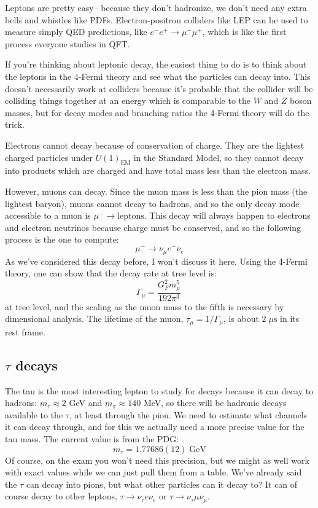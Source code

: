 \documentclass[11pt, oneside]{article}   	%
\theoremstyle{definition}
\numberwithin{equation}{subsection}		%
\begin{document}
Leptons are pretty easy-- because they don't hadronize, we don't need any extra bells and whistles like PDFs. Electron-positron colliders like 
LEP can be used to measure simply QED predictions, like $e^- e^+\rightarrow \mu^-\mu^+$, which is like the first process everyone studies 
in QFT. 

If you're thinking about leptonic decay, the easiest thing to do is to think about the leptons in the 4-Fermi theory and see what the 
particles can decay into. This doesn't necessarily work at colliders because it's probable that the collider will be colliding things together at 
an energy which is comparable to the $W$ and $Z$ boson masses, but for decay modes and branching ratios the 4-Fermi theory will do 
the trick. 

Electrons cannot decay because of conservation of charge. They are the lightest charged particles under $U(1)_\mathrm{EM}$ in the 
Standard Model, so they cannot decay into products which are charged and have total mass less than the electron mass. 

However, muons can decay. Since the muon mass is less than the pion mass (the lightest baryon), muons cannot decay to hadrons, and 
so the only decay mode accessible to a muon is $\mu^-\rightarrow\mathrm{leptons}$. This decay will always happen to electrons and 
electron neutrinos because charge must be conserved, and so the following process is the one to compute:
\begin{equation}
	\mu^-\rightarrow\nu_\mu e^-\overline\nu_e
\end{equation}
As we've considered this decay before, I won't discuss it here. Using the 4-Fermi theory, one can show that the decay rate at tree level 
is:
\begin{equation}
	\Gamma_\mu = \frac{G_F^2 m_\mu^5}{192\pi^3}~
	\label{eq:muon_lifetime}
\end{equation}
at tree level, and the scaling as the muon mass to the fifth is necessary by dimensional analysis. The lifetime of the muon, $\tau_\mu = 1 / \Gamma_\mu$, is 
about $2\;\mu\mathrm{s}$ in its rest frame. 

\subsection{$\tau$ decays}

The tau is the most interesting lepton to study for decays because it can decay to hadrons: $m_\tau \approx 2$ GeV and $m_\pi\approx 140$ MeV, so 
there will be hadronic decays available to the $\tau$, at least through the pion. We need to estimate what channels it can decay through, and for this 
we actually need a more precise value for the tau mass. The current value is from the PDG:
\begin{equation}
	m_\tau = 1.77686(12)\;\mathrm{GeV}
\end{equation}
Of course, on the exam you won't need this precision, but we might as well work with exact values while we can just pull them from a table. We've already said the 
$\tau$ can decay into pions, but what other particles can it decay to? It can of course decay to other leptons, $\tau\rightarrow \nu_\tau e \nu_e$ or $\tau\rightarrow\nu_\tau 
\mu\nu_\mu$. 
\end{document}
